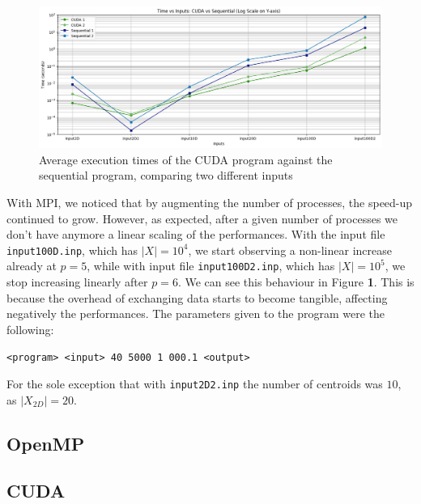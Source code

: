 \documentclass[11pt, journal]{IEEEtran}
\begin{document}
\begin{figure}
    \label{stats_cuda}
    \centering
    \includegraphics[width = \linewidth]{imgs/cuda_times.png}
    \caption{Average execution times of the CUDA program against the sequential program, comparing two different inputs}
\end{figure}

With MPI, we noticed that by augmenting the number of processes, the speed-up continued to grow. However, as expected, after a given number of processes we don't have anymore a linear scaling of the performances. With the input file \verb|input100D.inp|, which has $|X| = 10^4$, we start observing a non-linear increase already at $p = 5$, while with input file \verb|input100D2.inp|, which has $|X| = 10^5$, we stop increasing linearly after $p = 6$. We can see this behaviour in Figure \textbf{1}. This is because the overhead of exchanging data starts to become tangible, affecting negatively the performances. The parameters given to the program were the following:

\begin{center}
    \footnotesize
    \verb|<program> <input> 40 5000 1 000.1 <output>|
\end{center}

For the sole exception that with \verb|input2D2.inp| the number of centroids was $10$, as $|X_{2D}| = 20$.

\subsection{OpenMP}

\subsection{CUDA}
\end{document}
